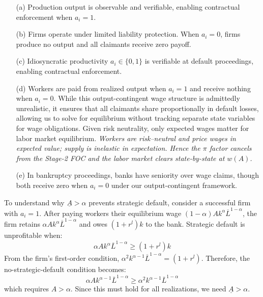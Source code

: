 \documentclass[12pt]{article}
\begin{document}
\begin{assumption}\label{ass:contract}
\begin{enumerate}
    \item[(a)] Production output is observable and verifiable, enabling contractual enforcement when $a_{i}=1$.
    \item[(b)] Firms operate under limited liability protection. When $a_{i}=0$, firms produce no output and all claimants receive zero payoff.
    \item[(c)] Idiosyncratic productivity $a_i \in \{0,1\}$ is verifiable at default proceedings, enabling contractual enforcement.
    \item[(d)] Workers are paid from realized output when $a_{i}=1$ and receive nothing when $a_{i}=0$. While this output-contingent wage structure is admittedly unrealistic, it ensures that all claimants share proportionally in default losses, allowing us to solve for equilibrium without tracking separate state variables for wage obligations. Given risk neutrality, only expected wages matter for labor market equilibrium. \emph{Workers are risk–neutral and price wages in expected value; supply is inelastic in expectation. Hence the $\pi$ factor cancels from the Stage-2 FOC and the labor market clears state-by-state at $w(A)$.}

    \item[(e)] In bankruptcy proceedings, banks have seniority over wage claims, though both receive zero when $a_{i}=0$ under our output-contingent framework.
\end{enumerate}
\end{assumption}

\begin{remark}
To understand why $\underline{A} > \alpha$ prevents strategic default, consider a successful firm with $a_{i}=1$. After paying workers their equilibrium wage $(1-\alpha)Ak^{\alpha}\overline{L}^{1-\alpha}$, the firm retains $\alpha Ak^{\alpha}\overline{L}^{1-\alpha}$ and owes $(1+r^{l})k$ to the bank. Strategic default is unprofitable when:
\begin{equation}
    \alpha Ak^{\alpha}\overline{L}^{1-\alpha} \ge (1+r^{l})k
\end{equation}
From the firm's first-order condition, $\alpha^{2}k^{\alpha-1}\overline{L}^{1-\alpha}=(1+r^{l})$. Therefore, the no-strategic-default condition becomes:
\begin{equation}
    \alpha Ak^{\alpha-1}\overline{L}^{1-\alpha} \ge \alpha^{2}k^{\alpha-1}\overline{L}^{1-\alpha}
\end{equation}
which requires $A > \alpha$. Since this must hold for all realizations, we need $\underline{A} > \alpha$.
\end{remark}
\end{document}
